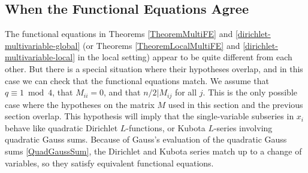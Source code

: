\documentclass[11pt,letterpaper]{article}
\theoremstyle{definition}
\theoremstyle{remark}
\numberwithin{equation}{section}
\theoremstyle{dotless}
\newcommand{\res}[2]{\left(\frac{#1}{#2}\right)}
\begin{document}


\subsection{When the Functional Equations Agree}

The functional equations in Theorems \ref{TheoremMultiFE} and \ref{dirichlet-multivariable-global} (or Theorems \ref{TheoremLocalMultiFE} and \ref{dirichlet-multivariable-local} in the local setting) appear to be quite different from each other. But there is a special situation where their hypotheses overlap, and in this case we can check that the functional equations match. We assume that $q\equiv 1 \bmod 4$, that $M_{ii}=0$, and that $n/2|M_{ij}$ for all $j$. This is the only possible case where the hypotheses on the matrix $M$ used in this section and the previous section overlap. This hypothesis will imply that the single-variable subseries in $x_i$ behave like quadratic Dirichlet $L$-functions, or Kubota $L$-series involving quadratic Gauss sums. Because of Gauss's evaluation of the quadratic Gauss sums \eqref{QuadGaussSum}, the Dirichlet and Kubota series match up to a change of variables, so they satisfy equivalent functional equations. 
\end{document}
